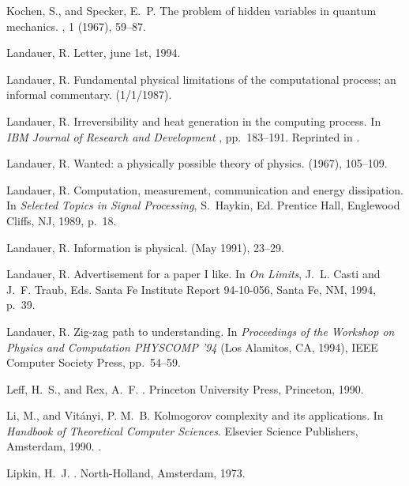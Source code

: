 \begin{thebibliography}{100}
{\sc Kochen, S., and Specker, E.~P.}
\newblock The problem of hidden variables in quantum mechanics.
, 1 (1967), 59--87.

{\sc Landauer, R.}
\newblock Letter, june 1st, 1994.

{\sc Landauer, R.}
\newblock Fundamental physical limitations of the computational process; an
  informal commentary.
 (1/1/1987).

{\sc Landauer, R.}
\newblock Irreversibility and heat generation in the computing process.
\newblock In {\em IBM Journal of Research and Development\/}
  \cite{maxwell-demon}, pp.~183--191.
\newblock Reprinted in \cite[pp. 188-196]{maxwell-demon}.

{\sc Landauer, R.}
\newblock Wanted: a physically possible theory of physics.
 (1967), 105--109.

{\sc Landauer, R.}
\newblock Computation, measurement, communication and energy dissipation.
\newblock In {\em Selected Topics in Signal Processing}, S.~Haykin, Ed.
  Prentice Hall, Englewood Cliffs, NJ, 1989, p.~18.

{\sc Landauer, R.}
\newblock Information is physical.
 (May 1991), 23--29.

{\sc Landauer, R.}
\newblock Advertisement for a paper {I} like.
\newblock In {\em On Limits}, J.~L. Casti and J.~F. Traub, Eds. Santa Fe
  Institute Report 94-10-056, Santa Fe, NM, 1994, p.~39.

{\sc Landauer, R.}
\newblock Zig-zag path to understanding.
\newblock In {\em Proceedings of the Workshop on Physics and Computation
  PHYSCOMP '94\/} (Los Alamitos, CA, 1994), IEEE Computer Society Press,
  pp.~54--59.

{\sc Leff, H.~S., and Rex, A.~F.}
.
\newblock Princeton University Press, Princeton, 1990.

{\sc Li, M., and Vit{\'{a}}nyi, P. M.~B.}
\newblock Kolmogorov complexity and its applications.
\newblock In {\em Handbook of Theoretical Computer Sciences}. Elsevier Science
  Publishers, Amsterdam, 1990.
\newblock \cite{leeuwen-90}.

{\sc Lipkin, H.~J.}
.
\newblock North-Holland, Amsterdam, 1973.


\end{thebibliography}
